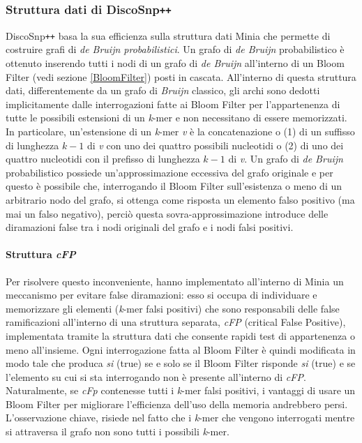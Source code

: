 \documentclass[../main.tex]{subfiles}
\begin{document}
\subsubsection{Struttura dati di DiscoSnp\texttt{++}}
\label{dBG_prob}

DiscoSnp\texttt{++} basa la sua efficienza sulla struttura dati Minia \cite{chikhi2013space} che permette di costruire grafi di \textit{de Bruijn probabilistici}. Un grafo di \textit{de Bruijn} probabilistico è ottenuto inserendo tutti i nodi di un grafo di \textit{de Bruijn} all'interno di un Bloom Filter (vedi sezione \ref{BloomFilter}) posti in cascata. All'interno di questa struttura dati, differentemente da un grafo di \textit{Bruijn} classico, gli archi sono dedotti implicitamente dalle interrogazioni fatte ai Bloom Filter per l'appartenenza di tutte le possibili estensioni di un \textit{k}-mer e non necessitano di essere memorizzati. In particolare, un'estensione di un \textit{k}-mer \textit{v} è la concatenazione o (1) di un suffisso di lunghezza $k-1$ di \textit{v} con uno dei quattro possibili nucleotidi o (2) di uno dei quattro nucleotidi con il prefisso di lunghezza $k-1$ di \textit{v}. Un grafo di \textit{de Bruijn} probabilistico possiede un'approssimazione eccessiva del grafo originale e per questo è possibile che, interrogando il Bloom Filter sull'esistenza o meno di un arbitrario nodo del grafo, si ottenga come risposta un elemento falso positivo (ma mai un falso negativo), perciò questa sovra-approssimazione introduce delle diramazioni false tra i nodi originali del grafo e i nodi falsi positivi.

\paragraph{Struttura \textit{cFP}} Per risolvere questo inconveniente,\cite{chikhi2013space} hanno implementato all'interno di Minia un meccanismo per evitare false diramazioni: esso si occupa di individuare e memorizzare gli elementi (\textit{k}-mer falsi positivi) che sono responsabili delle false ramificazioni all'interno di una struttura separata, \textit{cFP} (critical False Positive), implementata tramite la struttura dati che consente rapidi test di appartenenza o meno all'insieme. Ogni interrogazione fatta al Bloom Filter è quindi modificata in modo tale che produca \textit{si} (true) se e solo se il Bloom Filter risponde \textit{si} (true) e se l'elemento su cui si sta interrogando non è presente all'interno di \textit{cFP}. Naturalmente, se \textit{cFp} contenesse tutti i \textit{k}-mer falsi positivi, i vantaggi di usare un Bloom Filter per migliorare l'efficienza dell'uso della memoria andrebbero persi. L'osservazione chiave, risiede nel fatto che i \textit{k}-mer che vengono interrogati mentre si attraversa il grafo non sono tutti i possibili \textit{k}-mer. 
\end{document}
